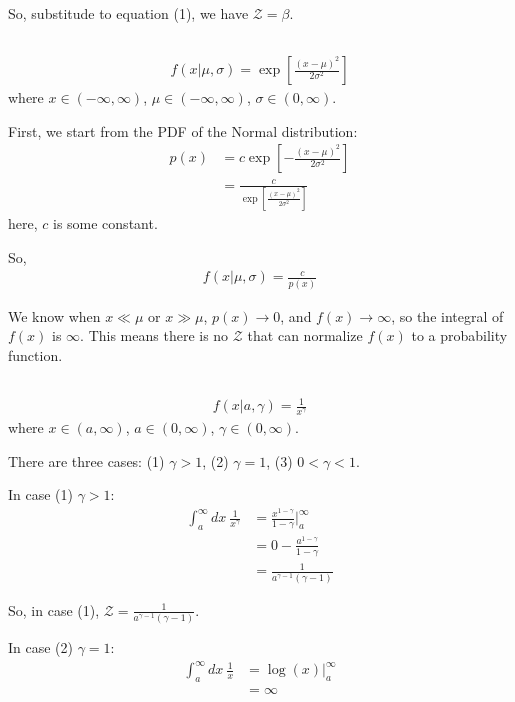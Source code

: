 So, substitude to equation (1), we have $\mathcal{Z} = \beta$.

\subsection{}
\begin{align*}
    f(x|\mu,\sigma)=\exp[\frac{(x-\mu)^2}{2\sigma^2}]
\end{align*}
where $x \in (-\infty, \infty)$, $\mu \in (-\infty, \infty)$, $\sigma \in (0, \infty)$.

First, we start from the PDF of the Normal distribution: 
\begin{align*}
    p(x) &= c \exp[-\frac{(x-\mu)^2}{2\sigma^2}] \\
    &= \frac{c}{\exp[\frac{(x-\mu)^2}{2\sigma^2}]}
\end{align*}
here, $c$ is some constant.

So,
\begin{align*}
    f(x|\mu,\sigma) = \frac{c}{p(x)}
\end{align*}

We know when $x \ll \mu$ or $x \gg \mu$, $p(x) \rightarrow 0$, and $f(x) \rightarrow \infty$, so the integral of $f(x)$ is $\infty$.
This means there is no $\mathcal{Z}$ that can normalize $f(x)$ to a probability function.

\subsection{}
\begin{align*}
    f(x|a,\gamma)=\frac{1}{x^\gamma}
\end{align*}
where $x \in (a, \infty)$, $a \in (0, \infty)$, $\gamma \in (0, \infty)$.

There are three cases: (1) $\gamma>1$, (2) $\gamma=1$, (3) $0<\gamma<1$.

In case (1) $\gamma>1$:
\begin{align*}
    \int_a^{\infty} dx\ \frac{1}{x^{\gamma}}
    &= \frac{x^{1-\gamma}}{1-\gamma} \biggr\rvert _a^{\infty} \\
    &= 0 - \frac{a^{1-\gamma}}{1-\gamma} \\
    &= \frac{1}{a^{\gamma-1} (\gamma-1)}
\end{align*}

So, in case (1), $\mathcal{Z} = \frac{1}{a^{\gamma-1} (\gamma-1)}$.

In case (2) $\gamma=1$:
\begin{align*}
    \int_a^{\infty} dx\ \frac{1}{x}
    &= \log(x) \biggr\rvert _a^{\infty} \\
    &= \infty
\end{align*}

